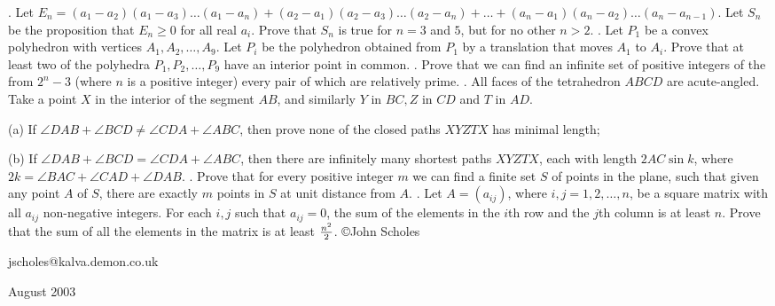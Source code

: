 \nopagenumbers
{}
\vskip 25pt
. Let $E_n=(a_1-a_2)(a_1-a_3)\ldots(a_1-a_n)+(a_2-a_1)(a_2-a_3)\ldots(a_2-a_n)+\ldots+(a_n-a_1)(a_n-a_2)\ldots(a_n-a_{n-1})$. Let $S_n$ be the proposition that $E_n\ge0$ for all real $a_i$. Prove that $S_n$ is true for $n=3$ and $5$, but for no other $n>2$.
\vskip 12pt
. Let $P_1$ be a convex polyhedron with vertices $A_1,A_2,\ldots,A_9$. Let $P_i$ be the polyhedron obtained from $P_1$ by a translation that moves $A_1$ to $A_i$. Prove that at least two of the polyhedra $P_1,P_2,\ldots,P_9$ have an interior point in common.
\vskip 12pt
. Prove that we can find an infinite set of positive integers of the from $2^n-3$ (where $n$ is a positive integer) every pair of which are relatively prime.
\vskip 12pt
. All faces of the tetrahedron $ABCD$ are acute-angled. Take a point $X$ in the interior of the segment $AB$, and similarly $Y$ in $BC, Z$ in $CD$ and $T$ in $AD$.

(a) If $\angle DAB+\angle BCD\ne\angle CDA+\angle ABC$, then prove none of the closed paths $XYZTX$ has minimal length;

(b) If $\angle DAB+\angle BCD=\angle CDA+\angle ABC$, then there are infinitely many shortest paths $XYZTX$, each with length $2AC\sin k$, where $2k=\angle BAC+\angle CAD+\angle DAB$.
\vskip 12pt
. Prove that for every positive integer $m$ we can find a finite set $S$ of points in the plane, such that given any point $A$ of $S$, there are exactly $m$ points in $S$ at unit distance from $A$.
\vskip 12pt
. Let $A=(a_{ij})$, where $i,j=1,2,\ldots,n$, be a square matrix with all $a_{ij}$ non-negative integers. For each $i,j$ such that $a_{ij}=0$, the sum of the elements in the $i$th row and the $j$th column is at least $n$. Prove that the sum of all the elements in the matrix is at least $n^2\over2$.
\vskip 20pt
\noindent \copyright John Scholes

\noindent jscholes@kalva.demon.co.uk

 August 2003

\bye
